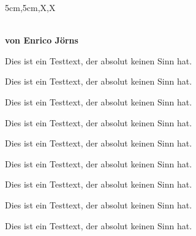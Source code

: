 \documentclass[a3paper,scifiposter,style=scifi]{tubsposter}
\begin{document}
  \begin{tubsposter}{5cm,5cm,X,X}
  \begin{posterrow}
    \bfseries{}\\[1em]
    von Enrico Jörns
  \end{posterrow}
  \begin{posterrow}[X,3cm,X]
    \begin{postercol}
      Dies ist ein Testtext, der absolut keinen Sinn hat.
    \end{postercol}
    \begin{postercol}
      Dies ist ein Testtext, der absolut keinen Sinn hat.
    \end{postercol}
    \begin{postercol}
      Dies ist ein Testtext, der absolut keinen Sinn hat.
    \end{postercol}
  \end{posterrow}
  \begin{posterrow}[X,X,X]
    \begin{postercol}
      Dies ist ein Testtext, der absolut keinen Sinn hat.
    \end{postercol}
    \begin{postercol}
      Dies ist ein Testtext, der absolut keinen Sinn hat.
    \end{postercol}
    \begin{postercol}
      Dies ist ein Testtext, der absolut keinen Sinn hat.
    \end{postercol}
  \end{posterrow}
  \begin{posterrow}[5cm,X,5cm]
    \begin{postercol}
      Dies ist ein Testtext, der absolut keinen Sinn hat.
    \end{postercol}
    \begin{postercol}
      Dies ist ein Testtext, der absolut keinen Sinn hat.
    \end{postercol}
    \begin{postercol}
      Dies ist ein Testtext, der absolut keinen Sinn hat.
    \end{postercol}
  \end{posterrow}
\end{tubsposter}
\end{document}
